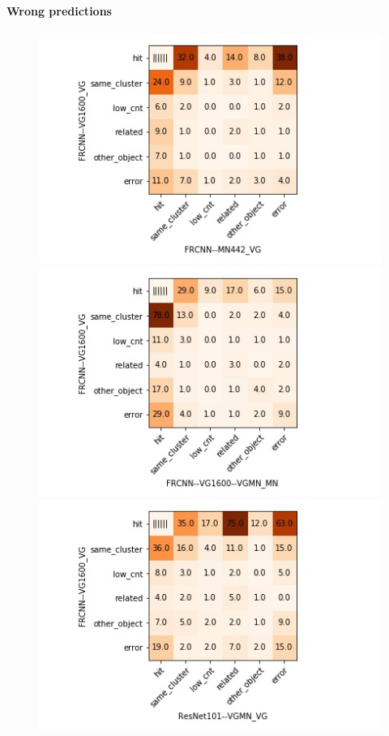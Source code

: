 \paragraph{Wrong predictions}

\begin{figure}[t]
\includegraphics[scale=.5]{images/matrix_FRCNN--VG1600_VG_FRCNN--MN442_VG.jpg}
\includegraphics[scale=.5]{images/matrix_FRCNN--VG1600_VG_FRCNN--VG1600--VGMN_MN.jpg}
\includegraphics[scale=.5]{images/matrix_FRCNN--VG1600_VG_ResNet101--VGMN_VG.jpg}

\end{figure}
